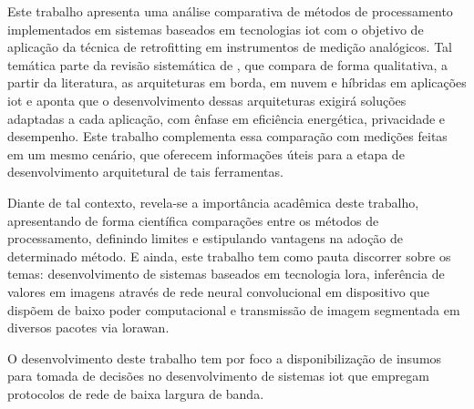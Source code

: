 Este trabalho apresenta uma análise comparativa de métodos de processamento  
implementados em sistemas baseados em tecnologias \gls{iot} com o objetivo 
de aplicação da técnica de \gls{retrofitting} em instrumentos de medição analógicos.
Tal temática parte da revisão sistemática de , que compara de
forma qualitativa, a partir da literatura, as arquiteturas em borda, em nuvem e híbridas em
aplicações \gls{iot} e aponta que o desenvolvimento dessas arquiteturas exigirá soluções
adaptadas a cada aplicação, com ênfase em eficiência energética, privacidade e desempenho.
Este trabalho complementa essa comparação com medições feitas em um mesmo cenário, que
oferecem informações úteis para a etapa de desenvolvimento arquitetural de tais ferramentas.

Diante de tal contexto, revela-se a importância acadêmica deste trabalho, 
apresentando de forma científica comparações entre os métodos de processamento, 
definindo limites e estipulando vantagens na adoção de determinado método. E ainda, 
este trabalho tem como pauta discorrer sobre os temas: 
desenvolvimento de sistemas baseados em tecnologia \gls{lora},
inferência de valores em imagens através de rede neural 
convolucional em dispositivo que dispõem de baixo poder 
computacional e transmissão de imagem segmentada 
em diversos pacotes via \gls{lorawan}.


O desenvolvimento deste trabalho tem por foco a disponibilização de insumos para 
tomada de decisões no desenvolvimento de sistemas \gls{iot} que empregam protocolos de 
rede de baixa largura de banda.

